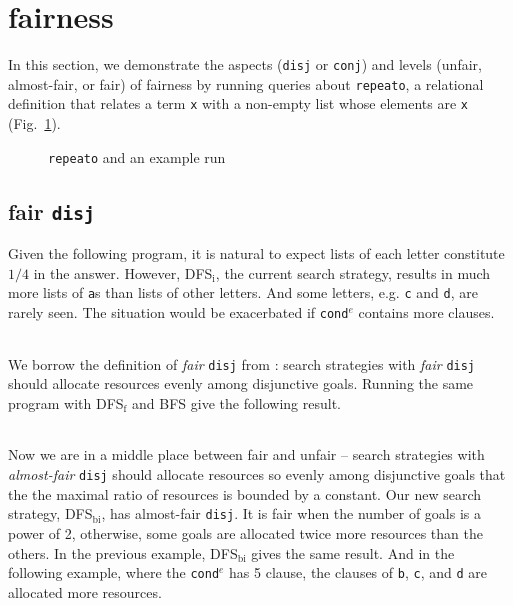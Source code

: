 \documentclass[format=acmlarge, review=true, authordraft=true]{acmart}
\newcommand{\conde}{\texttt{cond$^e$} }
\newcommand{\conj}{\texttt{conj}}
\newcommand{\disj}{\texttt{disj}}
\begin{document}
\section{fairness}

In this section, we demonstrate the aspects (\disj{} or \conj{}) and levels
(unfair, almost-fair, or fair) of fairness by running queries about
\texttt{repeato}, a 
relational definition that relates a term \texttt{x} with a non-empty list 
whose elements are \texttt{x} (Fig.~\ref{repeato}).

\begin{figure}
	
	\caption{\texttt{repeato} and an example run}
	\label{repeato}
\end{figure}

\subsection{fair \texttt{disj}}

Given the following program, it is natural to expect lists of each letter
constitute $1/4$ in the answer. However, DFS$_\textrm{i}$, the current search
strategy, results in much more lists of \texttt{a}s than lists of other
letters. And some letters, e.g. \texttt{c} and \texttt{d}, are rarely seen.
The situation would be exacerbated if \conde contains more clauses.

\begin{center}
	\begin{tabular}{c}
		
	\end{tabular}
\end{center}

We borrow the definition of \emph{fair} \disj{} from \cite{seres1999algebra}: 
search strategies with \emph{fair} \disj{} should allocate resources evenly 
among disjunctive goals. Running the same program with DFS$_\textrm{f}$ and BFS give the 
following result. 

\begin{center}
	\begin{tabular}{c}
		
	\end{tabular}
\end{center}

Now we are in a middle place between fair and unfair -- search strategies
with  \emph{almost-fair} \disj{} should allocate resources so evenly among
disjunctive  goals\citep{seres1999algebra} that the the maximal ratio of
resources is bounded by a constant. Our new search strategy,
DFS$_\textrm{bi}$, has almost-fair \disj{}. It is
fair when the number of goals is a power of 2, otherwise, some goals are 
allocated twice more resources than the others. In the previous example,
DFS$_\textrm{bi}$
gives the same result. And in the following example, where the \conde has 5 
clause, the clauses of \texttt{b}, \texttt{c}, and \texttt{d} are allocated 
more resources.
\end{document}
